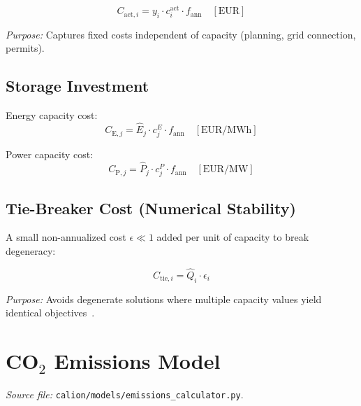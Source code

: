 \documentclass[a4paper,12pt]{article}
\begin{document}
\begin{equation}
  C_{\text{act},i}
  = y_{i} \cdot c^{\text{act}}_{i} \cdot f_{\text{ann}}
  \quad [\text{EUR}]
  \tag{INV-4}
  \label{eq:inv4}
\end{equation}

\noindent\textit{Purpose:} Captures fixed costs independent of capacity (planning, grid
connection, permits).

\subsection{Storage Investment}

\noindent Energy capacity cost:
\begin{equation}
  C_{\text{E},j}
  = \hat{E}_{j} \cdot c^{E}_{j} \cdot f_{\text{ann}}
  \quad [\text{EUR/MWh}]
  \tag{INV-5}
  \label{eq:inv5}
\end{equation}

\noindent Power capacity cost:
\begin{equation}
  C_{\text{P},j}
  = \hat{P}_{j} \cdot c^{P}_{j} \cdot f_{\text{ann}}
  \quad [\text{EUR/MW}]
  \tag{INV-6}
  \label{eq:inv6}
\end{equation}

\subsection{Tie-Breaker Cost (Numerical Stability)}

A small non-annualized cost $\epsilon \ll 1$ added per unit of capacity to break degeneracy:

\begin{equation}
  C_{\text{tie},i} = \hat{Q}_{i} \cdot \epsilon_{i}
  \tag{INV-7}
  \label{eq:inv7}
\end{equation}

\noindent\textit{Purpose:} Avoids degenerate solutions where multiple capacity values yield
identical objectives~\cite{Glover1974}.

\section{CO\texorpdfstring{$_2$}{2} Emissions Model}
\label{sec:co2}

\textit{Source file:} \texttt{calion/models/emissions\_calculator.py}.
\end{document}
